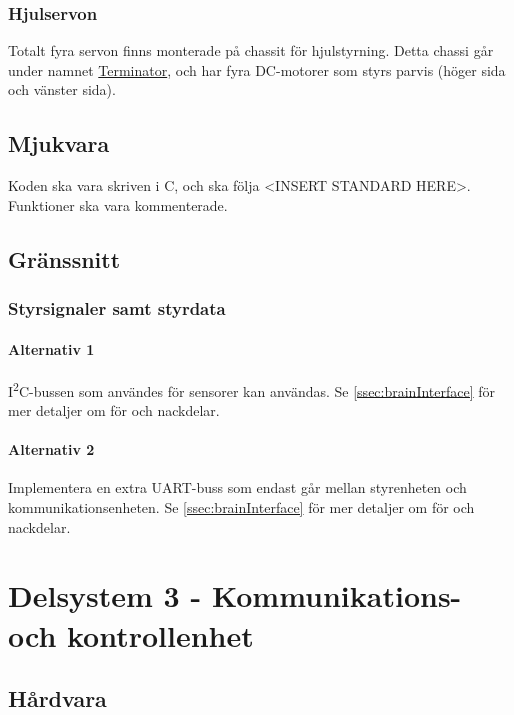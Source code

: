 \documentclass[a4paper,11pt]{article}
\begin{document}
\subsubsection{Hjulservon}
Totalt fyra servon finns monterade på chassit för hjulstyrning. Detta chassi går under namnet \href{https://docs.isy.liu.se/pub/VanHeden/DataSheets/terminator_prel.pdf}{Terminator}, och har fyra DC-motorer som styrs parvis (höger sida och vänster sida).

\subsection{Mjukvara}

Koden ska vara skriven i C, och ska följa <INSERT STANDARD HERE>. Funktioner ska vara kommenterade.

\subsection{Gränssnitt} \label{ssec:controllInterface}

\subsubsection{Styrsignaler samt styrdata}

\paragraph{Alternativ 1}
I\textsuperscript{2}C-bussen som användes för sensorer kan användas. Se \ref{ssec:brainInterface} för mer detaljer om för och nackdelar.

\paragraph{Alternativ 2}
Implementera en extra UART-buss som endast går mellan styrenheten och kommunikationsenheten. Se \ref{ssec:brainInterface} för mer detaljer om för och nackdelar.

\section{Delsystem 3 - Kommunikations- och kontrollenhet}

\subsection{Hårdvara}
\end{document}
